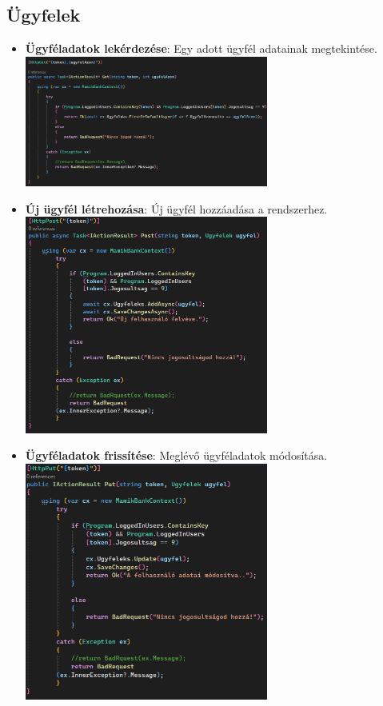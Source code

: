 \documentclass[colorlinks]{thesis-kando}
\theoremstyle{definition}
\theoremstyle{remark}
\begin{document}
\begin{itemize}
\subsection{Ügyfelek}
\begin{itemize}
    \item \textbf{Ügyféladatok lekérdezése}: Egy adott ügyfél adatainak megtekintése.
    \\
    \includegraphics[width=8cm]{figures/ugyfellkerdezes.png}
    \item \textbf{Új ügyfél létrehozása}: Új ügyfél hozzáadása a rendszerhez.
    \\
    \includegraphics[width=8cm]{figures/ugyfelletrehozas.png}
    \newpage
    \item \textbf{Ügyféladatok frissítése}: Meglévő ügyféladatok módosítása.
    \\
    \includegraphics[width=8cm]{figures/ugyfelmodositas.png}

\end{itemize}
\end{itemize}
\end{document}
